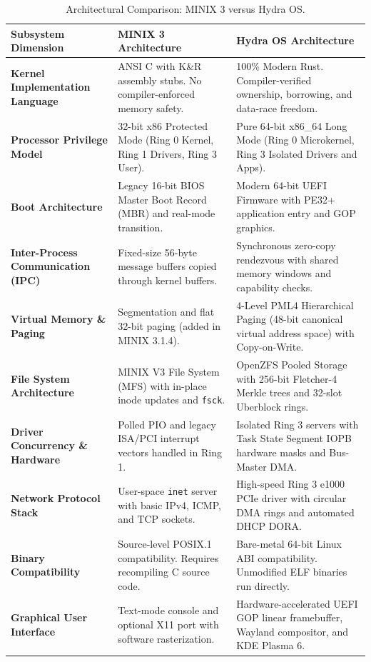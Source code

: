 \begin{table}[htbp]
\centering
\small
\begin{tabularx}{\textwidth}{lXX}
\toprule
\textbf{Subsystem Dimension} & \textbf{MINIX 3 Architecture} & \textbf{Hydra OS Architecture} \\
\midrule
\textbf{Kernel Implementation Language} & ANSI C with K\&R assembly stubs. No compiler-enforced memory safety. & 100\% Modern Rust. Compiler-verified ownership, borrowing, and data-race freedom. \\
\midrule
\textbf{Processor Privilege Model} & 32-bit x86 Protected Mode (Ring 0 Kernel, Ring 1 Drivers, Ring 3 User). & Pure 64-bit x86\_64 Long Mode (Ring 0 Microkernel, Ring 3 Isolated Drivers and Apps). \\
\midrule
\textbf{Boot Architecture} & Legacy 16-bit BIOS Master Boot Record (MBR) and real-mode transition. & Modern 64-bit UEFI Firmware with PE32+ application entry and GOP graphics. \\
\midrule
\textbf{Inter-Process Communication (IPC)} & Fixed-size 56-byte message buffers copied through kernel buffers. & Synchronous zero-copy rendezvous with shared memory windows and capability checks. \\
\midrule
\textbf{Virtual Memory \& Paging} & Segmentation and flat 32-bit paging (added in MINIX 3.1.4). & 4-Level PML4 Hierarchical Paging (48-bit canonical virtual address space) with Copy-on-Write. \\
\midrule
\textbf{File System Architecture} & MINIX V3 File System (MFS) with in-place inode updates and \texttt{fsck}. & OpenZFS Pooled Storage with 256-bit Fletcher-4 Merkle trees and 32-slot Uberblock rings. \\
\midrule
\textbf{Driver Concurrency \& Hardware} & Polled PIO and legacy ISA/PCI interrupt vectors handled in Ring 1. & Isolated Ring 3 servers with Task State Segment IOPB hardware masks and Bus-Master DMA. \\
\midrule
\textbf{Network Protocol Stack} & User-space \texttt{inet} server with basic IPv4, ICMP, and TCP sockets. & High-speed Ring 3 e1000 PCIe driver with circular DMA rings and automated DHCP DORA. \\
\midrule
\textbf{Binary Compatibility} & Source-level POSIX.1 compatibility. Requires recompiling C source code. & Bare-metal 64-bit Linux ABI compatibility. Unmodified ELF binaries run directly. \\
\midrule
\textbf{Graphical User Interface} & Text-mode console and optional X11 port with software rasterization. & Hardware-accelerated UEFI GOP linear framebuffer, Wayland compositor, and KDE Plasma 6. \\
\bottomrule
\end{tabularx}
\caption{Architectural Comparison: MINIX 3 versus Hydra OS.}
\label{tab:minix_vs_hydra}
\end{table}

